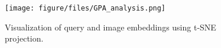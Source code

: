 \begin{figure}[t]
    \centering
    \texttt{[image: figure/files/GPA\_analysis.png]}
    \vspace{-0.1in}
    \caption{Visualization of query and image embeddings using t-SNE projection.}
    \label{fig:tsne}
\end{figure}
